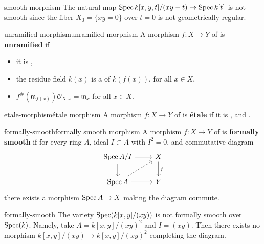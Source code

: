 \begin{example}{smooth-morphism}
    The natural map $\operatorname{Spec} k[x, y, t] / (xy - t) \to \operatorname{Spec} k[t]$ is not smooth since the fiber $X_0 = \{ xy = 0 \}$ over $t = 0$ is not geometrically regular.
\end{example}

\begin{topic}{unramified-morphism}{unramified morphism}
    A morphism $f : X \to Y$ of  is \textbf{unramified} if
    \begin{itemize}
        \item it is ,
        \item the residue field $k(x)$ is a  of $k(f(x))$, for all $x \in X$,
        \item $f^\#(\mathfrak{m}_{f(x)}) \mathcal{O}_{X, x} = \mathfrak{m}_x$ for all $x \in X$.
    \end{itemize}
\end{topic}

\begin{topic}{etale-morphism}{étale morphism}
    A morphism $f : X \to Y$ of  is \textbf{étale} if it is ,  and .
\end{topic}

\begin{topic}{formally-smooth}{formally smooth morphism}
    A morphism $f : X \to Y$ of  is \textbf{formally smooth} if for every ring $A$, ideal $I \subset A$ with $I^2 = 0$, and commutative diagram
    \[ \begin{tikzcd} \Spec A/I \arrow{r} \arrow{d} & X \arrow{d}{f} \\ \Spec A \arrow{r} \arrow[dashed]{ur} & Y \end{tikzcd} \]
    there exists a morphism $\operatorname{Spec} A \to X$ making the diagram commute.
\end{topic}

\begin{example}{formally-smooth}
    The variety $\operatorname{Spec}(k[x, y]/(xy))$ is not formally smooth over $\operatorname{Spec}(k)$. Namely, take $A = k[x, y] / (xy)^2$ and $I = (xy)$. Then there exists no morphism $k[x, y]/(xy) \to k[x, y]/(xy)^2$ completing the diagram.
\end{example}

